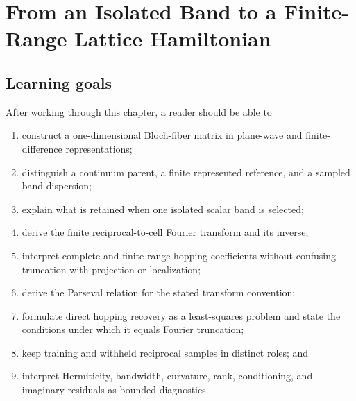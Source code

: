 \chapter{From an Isolated Band to a Finite-Range Lattice Hamiltonian}

\label{ch:training-isolated-band-fourier-reduction}


\section{Learning goals}

After working through this chapter, a reader should be able to

\begin{enumerate}
  \item construct a one-dimensional Bloch-fiber matrix in plane-wave and
        finite-difference representations;
  \item distinguish a continuum parent, a finite represented reference, and a
        sampled band dispersion;
  \item explain what is retained when one isolated scalar band is selected;
  \item derive the finite reciprocal-to-cell Fourier transform and its inverse;
  \item interpret complete and finite-range hopping coefficients without
        confusing truncation with projection or localization;
  \item derive the Parseval relation for the stated transform convention;
  \item formulate direct hopping recovery as a least-squares problem and state
        the conditions under which it equals Fourier truncation;
  \item keep training and withheld reciprocal samples in distinct roles; and
  \item interpret Hermiticity, bandwidth, curvature, rank, conditioning, and
        imaginary residuals as bounded diagnostics.
\end{enumerate}

